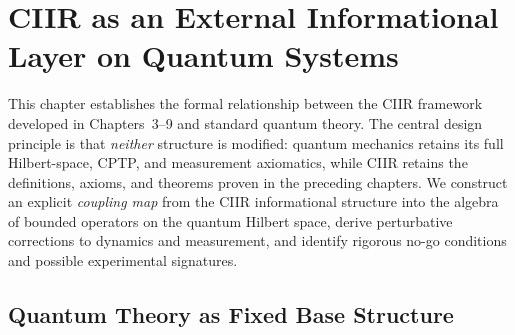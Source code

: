 
\chapter{CIIR as an External Informational Layer on Quantum Systems}
\label{ch:quantum_embedding}

\vspace{0.5em}
\noindent
This chapter establishes the formal relationship between the CIIR
framework developed in Chapters~3--9 and standard quantum theory.  The
central design principle is that \emph{neither} structure is modified:
quantum mechanics retains its full Hilbert-space, CPTP, and
measurement axiomatics, while CIIR retains the definitions, axioms,
and theorems proven in the preceding chapters.  We construct an
explicit \emph{coupling map} from the CIIR informational structure
into the algebra of bounded operators on the quantum Hilbert space,
derive perturbative corrections to dynamics and measurement, and
identify rigorous no-go conditions and possible experimental
signatures.

\section{Quantum Theory as Fixed Base Structure}
\label{sec:ch10:qm_base}

